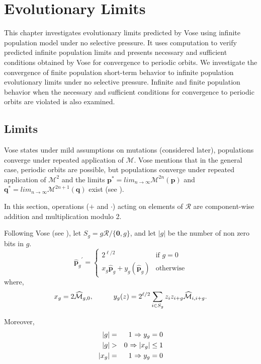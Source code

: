\chapter{Evolutionary Limits} \label{ch:evolutionary limits}
This chapter investigates evolutionary limits predicted by Vose using infinite population model under no selective pressure. 
It uses computation to verify predicted infinite population limits and presents necessary and sufficient conditions obtained by Vose for 
convergence to periodic orbits. We investigate the convergence of finite population short-term behavior 
to infinite population evolutionary limits under no selective pressure. Infinite and finite population behavior when 
the necessary and sufficient conditions for convergence to periodic orbits are violated is also examined.

\section{Limits}
\label{Limits}
Vose states under mild assumptions on mutations (considered later), populations converge under repeated application 
of $\mathcal{M}$. Vose mentions that in the general case, periodic orbits are possible, but populations converge under 
repeated application of $\mathcal{M}^2$ and the limits ${\bm p}^\ast = lim_{n \rightarrow \infty} \mathcal{M}^{2n}({\bm p})$ 
and ${\bm q}^\ast = lim_{n \rightarrow \infty} \mathcal{M}^{2n+1}({\bm q})$ exist (see \cite{Vose1999}).

In this section, operations ($+$ and $\cdot$) acting on elements of $\mathcal{R}$ are component-wise addition and multiplication modulo 2. 

Following Vose (see \cite{Vose1999}), let $S_g = g \mathcal{R} / \{\textbf{0}, g\}$, and let $|g|$ be the number of non zero bits in $g$.
\[
{{\widehat{{\bm p}}}_g}^{\prime}  = \begin{cases}
    2^{\ell /2}  & \text{if $g = 0$}\\
    x_g \widehat{{\bm p}}_g + y_g(\widehat{{\bm p}}_g) & \text{otherwise}
  \end{cases}
\]
where,
\[
x_g = 2\widehat{\mathcal{M}}_{g,0},  \hspace*{1cm} y_g(z) = 2^{\ell /2} \sum_{i \in S_g} z_i z_{i+g} \widehat{\mathcal{M}}_{i,i+g}.
\]

Moreover, 
\begin{eqnarray*}
|g| & = & 1 \hspace{0.01in} \Rightarrow y_g = 0 \\
|g| & > & 0 \hspace{0.01in} \Rightarrow |x_g| \leq 1 \\
|x_g| & = & 1 \hspace{0.01in} \Rightarrow y_g = 0
\end{eqnarray*}


